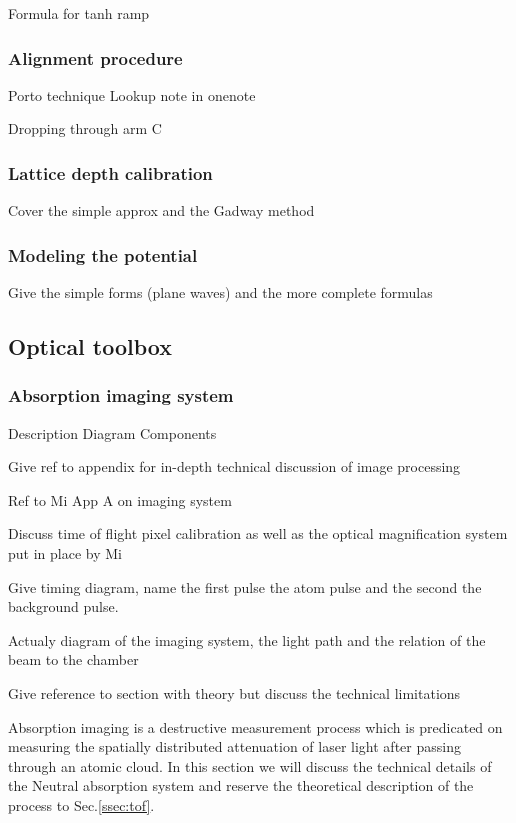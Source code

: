 Formula for tanh ramp

\subsubsection{Alignment procedure} \label{sssec:532_align}

Porto technique
Lookup note in onenote

Dropping through arm C

\subsubsection{Lattice depth calibration} \label{sssec:532_lattice_depth}

Cover the simple approx and the Gadway method

\subsubsection{Modeling the potential} \label{sssec:532_modeling}

Give the simple forms (plane waves) and the more complete formulas

\subsection{Optical toolbox} \label{ssec:op_tools}

\subsubsection{Absorption imaging system}

Description
Diagram
Components

Give ref to appendix for in-depth technical discussion of image processing

Ref to Mi App A on imaging system

Discuss time of flight pixel calibration as well as the optical magnification system put in place by Mi

Give timing diagram, name the first pulse the atom pulse and the second the background pulse.

Actualy diagram of the imaging system, the light path and the relation of the beam to the chamber

Give reference to section with theory but discuss the technical limitations
 
Absorption imaging is a destructive measurement process which is predicated on measuring the spatially distributed attenuation of laser light after passing through an atomic cloud. In this section we will discuss the technical details of the Neutral absorption system and reserve the theoretical description of the process to Sec.\ref{ssec:tof}. 

